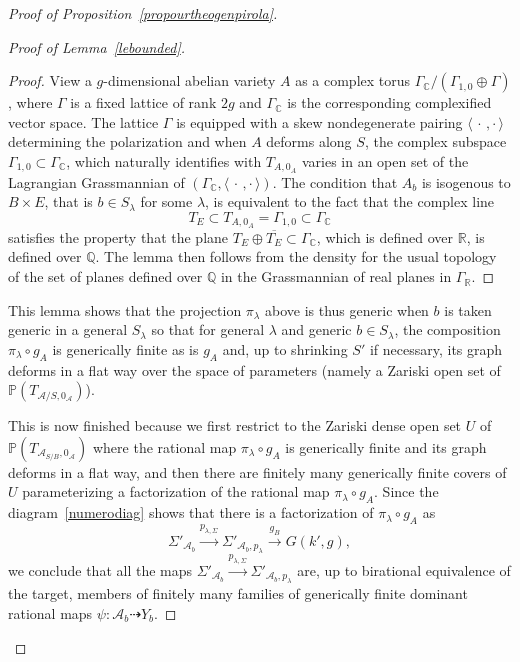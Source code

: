 \documentclass[11pt]{article}
\theoremstyle{definition}
\numberwithin{equation}{section}
\numberwithin{figure}{section}
\numberwithin{table}{section}
\begin{document}
\begin{proof}[Proof of Proposition~\ref{propourtheogenpirola}]
\begin{proof}[Proof of Lemma~\ref{lebounded}]
\begin{proof}
View a $g$-dimensional abelian variety $A$ as a complex torus $\Gamma_{\mathbb{C}}/(\Gamma_{1,0}\oplus\Gamma)$, where $\Gamma$ is a fixed lattice of rank $2g$ and $\Gamma_{\mathbb{C}}$ is the corresponding complexified vector space. The lattice $\Gamma$ is equipped with a skew nondegenerate pairing $\langle\,\cdot\,,\cdot\,\rangle$ determining the polarization and when $A$ deforms along $S$, the complex subspace $\Gamma_{1,0}\subset \Gamma_{\mathbb{C}}$, which naturally identifies with $T_{A,0_A}$ varies in an open set of the Lagrangian Grassmannian of $(\Gamma_{\mathbb{C}},\langle\,\cdot\,,\cdot\,\rangle)$. The condition that $A_b$ is isogenous to $B\times E$, that is $b\in S_\lambda$ for some $\lambda$, is equivalent to the fact that the complex line
\[
T_{E}\subset T_{A,0_A}=\Gamma_{1,0}\subset \Gamma_{\mathbb{C}}
\]
satisfies the property that the plane $ T_{E}\oplus \overline{ T_{E}}\subset \Gamma_{\mathbb{C}}$, which is defined over $\mathbb{R}$, is defined over $\mathbb{Q}$. The lemma then follows from the density for the usual topology of the set of planes defined over $\mathbb{Q}$ in the Grassmannian of real planes in $ \Gamma_{\mathbb{R}}$.
\end{proof}

This lemma shows that the projection $\pi_\lambda$ above is thus generic when $b$ is taken generic in a general $S_\lambda$ so that for general $\lambda$ and generic $b\in S_\lambda$, the composition $\pi_\lambda\circ g_A$ is generically finite as is $g_A$ and, up to shrinking $S'$ if necessary, its graph deforms in a flat way over the space of parameters (namely a Zariski open set of $\mathbb{P}(T_{\mathcal{A}/S,0_{\mathcal{A}}})$).

This is now finished because we first restrict to the Zariski dense open set $U$ of $\mathbb{P}(T_{\mathcal{A}_{S/B},0_{\mathcal{A}}})$ where the rational map $\pi_\lambda\circ g_A$ is generically finite and its graph deforms in a flat way, and then there are finitely many generically finite covers of $U$ parameterizing a factorization of the rational map $\pi_\lambda\circ g_A$. Since the diagram~\eqref{numerodiag} shows that there is a factorization of $\pi_\lambda\circ g_A$ as
\[
\Sigma'_{\mathcal{A}_b}\stackrel{p_{\lambda,\Sigma}}{\rightarrow }\Sigma'_{\mathcal{A}_b,p_\lambda}\stackrel{g_B}{\rightarrow }G(k',g),
\]
we conclude that all the maps $\Sigma'_{\mathcal{A}_b}\stackrel{p_{\lambda,\Sigma}}{\rightarrow }\Sigma'_{\mathcal{A}_b,p_\lambda}$ are, up to birational equivalence of the target, members of finitely many families of generically finite dominant rational maps $\psi:\mathcal{A}_b\dashrightarrow Y_b$.
\end{proof}


\end{proof}
\end{document}
